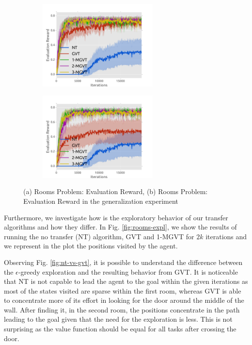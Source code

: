 \documentclass{article}
\begin{document}
\begin{figure}[t]
  \begin{subfigure}[b]{0.45\textwidth}
    \includegraphics[trim=0.5cm 0cm 1.8cm 1.3cm,clip=true,height=4.5cm]{images/three-room/erew.pdf}
    \caption{}
    \label{fig:3r-erew}
  \end{subfigure}
  \begin{subfigure}[b]{0.45\textwidth}
    \includegraphics[trim=0.5cm 0cm 1.8cm 1.3cm,clip=true,height=4.5cm]{images/three-room-gen/erew.pdf}
    \caption{}
    \label{fig:3rg-erew}
  \end{subfigure}
  \caption{(a) Rooms Problem: Evaluation Reward, (b) Rooms Problem: Evaluation Reward in the generalization experiment}
  \label{fig:rooms-erew}
\end{figure}


Furthermore, we investigate how is the exploratory behavior of our transfer algorithms  and how they differ. In Fig. \ref{fig:rooms-expl}, we show the results of running the no transfer (NT) algorithm, GVT and 1-MGVT for $2k$ iterations and we represent in the plot the positions visited by the agent.

Observing Fig. \ref{fig:nt-vs-gvt}, it is possible to understand the difference between the $\epsilon$-greedy exploration and the resulting behavior from GVT. It is noticeable that NT is not capable to lead the agent to the goal within the given iterations as most of the states visited are sparse within the first room, whereas GVT is able to concentrate more of its effort in looking for the door around the middle of the wall. After finding it, in the second room, the positions concentrate in the path leading to the goal given that the need for the exploration is less. This is not surprising as the value function should be equal for all tasks after crossing the door. 
\end{document}
